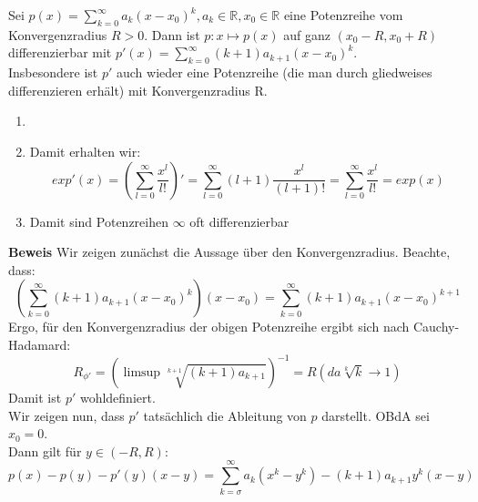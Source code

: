 \setcounter{Satz}{6} 
\begin{Satz}{
	Sei $p \left( x\right) = \sum_{k=0}^{ \infty}
	{ a_k \left( x-x_0\right)^k}, a_k \in 
	\mathbb{R} ,x_0 \in \mathbb{R}$ eine Potenzreihe vom Konvergenzradius 
	$R >0 $. Dann ist $p : x \mapsto p\left(x\right)$ auf ganz 
	$\left( x_0-R, x_0+R \right)$ differenzierbar mit 
	$p'\left( x \right) = \sum_{k=0}^\infty {\left( k+1\right) 
	a_{k+1} \left(x-x_0\right)^k}$.\\
	Insbesondere ist $p'$ auch wieder eine Potenzreihe 
	(die man durch gliedweises differenzieren erhält) mit	Konvergenzradius R.
}\end{Satz}

\begin{Bemerkung}{
	\begin{enumerate}
		\item[ ]
		\item Damit erhalten wir: 
		\begin{equation*}
			exp'\left(x\right) = \left( \sum_{l=0}^{\infty} \frac{x^l}{l!}\right)' 
			= \sum_{l=0}^{\infty} \left(l+1\right) \frac{x^l}{(l+1)!} 
			= \sum_{l=0}^{\infty} \frac{x^l}{l!} = exp(x)
		\end{equation*}
		\item Damit sind Potenzreihen $\infty$ oft differenzierbar
	\end{enumerate}
	\textbf{Beweis} Wir zeigen zunächst die Aussage über den Konvergenzradius. 
	Beachte, dass: 
	\begin{equation*}
		\left(\sum_{k=0}^{\infty} \left( k+1 \right) a_{k+1} \left( x -x_0 \right)^k \right)
		\left(x-x_0\right) = \sum_{k=0}^{\infty} \left(k+1\right) 
		a_{k+1} \left(x-x_0\right)^{k+1}
	\end{equation*}
	Ergo, für den Konvergenzradius der obigen Potenzreihe ergibt sich nach Cauchy-
	Hadamard:
	\begin{equation*}
		R_{\phi'} = \left(\limsup \sqrt[k+1]{\left(k+1\right)a_{k+1}}\right)^{-1}
		= R \left(\textit{da} \sqrt[k]{k} \rightarrow 1\right)
	\end{equation*}
	Damit ist $p'$ wohldefiniert.\\
	 Wir zeigen nun, dass $p'$ tatsächlich die Ableitung von $p$ darstellt. 
	 OBdA sei $x_0 = 0$. \\
	Dann gilt für $y \in \left(-R,R\right)$:
	\begin{equation*}
		p\left(x\right)-p\left(y\right) - p'\left(y\right)\left(x-y\right) 
		= \sum_{k= \sigma}^{\infty} a_k \left(x^k -y^k\right) - \left(k+1\right) 
		a_{k+1} y^k\left(x-y\right)

\end{equation*}}
\end{Bemerkung}
